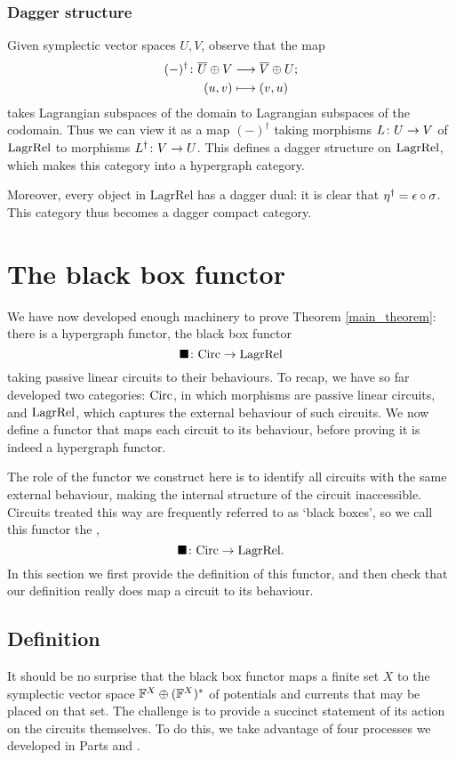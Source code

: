 \subsubsection*{Dagger structure}

Given symplectic vector spaces $U,V$, observe that the map
\begin{align*}
  (-)^\dagger{\colon} \overline{U} \oplus V &\longrightarrow \overline{V} \oplus U; \\
  (u,v) &\longmapsto (v,u)
\end{align*} 
takes Lagrangian subspaces of the domain to Lagrangian subspaces of the
codomain. Thus we can view it as a map $(-)^\dagger$ taking morphisms $L{\colon} U \to V$
of $\mathrm{LagrRel}$ to morphisms $L^\dagger{\colon} V \to U$. This defines a
dagger structure on $\mathrm{LagrRel}$, which makes this category into a
hypergraph category.

Moreover, every object in $\mathrm{LagrRel}$ has a dagger dual: it is clear that
$\eta^\dagger = \epsilon \circ \sigma$.   This category thus becomes a dagger compact
category.


\section{The black box functor} \label{sec:blackbox}
We have now developed enough machinery to prove Theorem \ref{main_theorem}:
there is a hypergraph functor, the black box functor
\[  
\blacksquare{\colon} \mathrm{Circ} \to \mathrm{LagrRel} 
\]
taking passive linear circuits to their behaviours. To recap, we have so far
developed two categories: $\mathrm{Circ}$, in which morphisms are passive linear
circuits, and $\mathrm{LagrRel}$, which captures the external behaviour of such circuits.
We now define a functor that maps each circuit to its behaviour, before proving
it is indeed a hypergraph functor. 

The role of the functor we construct here is to identify all circuits with the
same external behaviour, making the internal structure of the circuit
inaccessible. Circuits treated this way are frequently referred to as
`black boxes', so we call this functor the ,
\[
\blacksquare{\colon} \mathrm{Circ} \to \mathrm{LagrRel}.
\] 
In this section we first provide the definition of this functor, and then check
that our definition really does map a circuit to its behaviour.

\subsection{Definition}
It should be no surprise that the black box functor maps a finite set $X$ to the
symplectic vector space ${\mathbb F}^X \oplus ({\mathbb F}^X)^\ast$ of potentials and currents
that may be placed on that set. The challenge is to provide a succinct
statement of its action on the circuits themselves. To do this, we take
advantage of four processes we developed in Parts  and
.

